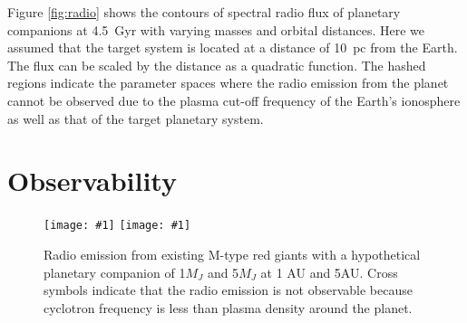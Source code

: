 \documentclass{emulateapj}
\def\plotonesc#1{\centering \leavevmode
\texttt{[image: \#1]}}
\def\plotoneh#1{\centering \leavevmode
\texttt{[image: \#1]}}
\begin{document}
Figure \ref{fig:radio} shows the contours of spectral radio flux of planetary companions at 4.5~Gyr with varying masses and orbital distances. Here we assumed that the target system is located at a distance of 10~pc from the Earth. The flux can be scaled by the distance as a quadratic function. 
The hashed regions indicate the parameter spaces where the radio emission from the planet cannot be observed due to the plasma cut-off frequency of the Earth's ionosphere as well as that of the target planetary system. 





\section{Observability}
\label{s:observability}


\begin{figure}[tbhp]
   \plotoneh{radio_1Mp_5AU.pdf}
   \plotoneh{radio_5Mp_5AU.pdf}
   \caption{Radio emission from existing M-type red giants with a hypothetical planetary companion of 1$M_J$ and 5$M_J$ at 1 AU and 5AU. Cross symbols indicate that the radio emission is not observable because cyclotron frequency is less than plasma density around the planet. }
  \label{fig:observability}
\end{figure}
\end{document}
